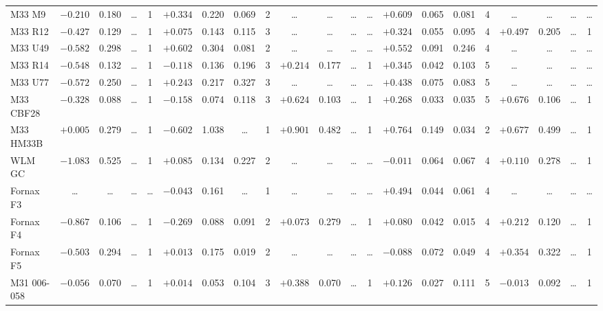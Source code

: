 \documentclass{aa}
\begin{document}
\begin{appendix}
\begin{table*}
\begin{adjustbox}{width=1\textwidth}
{\begin{tabular}{l cccccccccccccccccccc}
M33 M9        & $-0.210$ & 0.180 & \ldots & 1 & $+0.334$ & 0.220 & 0.069 & 2 & \ldots & \ldots & \ldots & \ldots & $+0.609$ & 0.065 & 0.081 & 4 & \ldots & \ldots & \ldots & \ldots \\
M33 R12       & $-0.427$ & 0.129 & \ldots & 1 & $+0.075$ & 0.143 & 0.115 & 3 & \ldots & \ldots & \ldots & \ldots & $+0.324$ & 0.055 & 0.095 & 4 & $+0.497$ & 0.205 & \ldots & 1 \\
M33 U49       & $-0.582$ & 0.298 & \ldots & 1 & $+0.602$ & 0.304 & 0.081 & 2 & \ldots & \ldots & \ldots & \ldots & $+0.552$ & 0.091 & 0.246 & 4 & \ldots & \ldots & \ldots & \ldots \\
M33 R14       & $-0.548$ & 0.132 & \ldots & 1 & $-0.118$ & 0.136 & 0.196 & 3 & $+0.214$ & 0.177 & \ldots & 1 & $+0.345$ & 0.042 & 0.103 & 5 & \ldots & \ldots & \ldots & \ldots \\
M33 U77       & $-0.572$ & 0.250 & \ldots & 1 & $+0.243$ & 0.217 & 0.327 & 3 & \ldots & \ldots & \ldots & \ldots & $+0.438$ & 0.075 & 0.083 & 5 & \ldots & \ldots & \ldots & \ldots \\
M33 CBF28     & $-0.328$ & 0.088 & \ldots & 1 & $-0.158$ & 0.074 & 0.118 & 3 & $+0.624$ & 0.103 & \ldots & 1 & $+0.268$ & 0.033 & 0.035 & 5 & $+0.676$ & 0.106 & \ldots & 1 \\
M33 HM33B     & $+0.005$ & 0.279 & \ldots & 1 & $-0.602$ & 1.038 & \ldots & 1 & $+0.901$ & 0.482 & \ldots & 1 & $+0.764$ & 0.149 & 0.034 & 2 & $+0.677$ & 0.499 & \ldots & 1 \\
WLM GC        & $-1.083$ & 0.525 & \ldots & 1 & $+0.085$ & 0.134 & 0.227 & 2 & \ldots & \ldots & \ldots & \ldots & $-0.011$ & 0.064 & 0.067 & 4 & $+0.110$ & 0.278 & \ldots & 1 \\
Fornax F3     & \ldots & \ldots & \ldots & \ldots & $-0.043$ & 0.161 & \ldots & 1 & \ldots & \ldots & \ldots & \ldots & $+0.494$ & 0.044 & 0.061 & 4 & \ldots & \ldots & \ldots & \ldots \\
Fornax F4     & $-0.867$ & 0.106 & \ldots & 1 & $-0.269$ & 0.088 & 0.091 & 2 & $+0.073$ & 0.279 & \ldots & 1 & $+0.080$ & 0.042 & 0.015 & 4 & $+0.212$ & 0.120 & \ldots & 1 \\
Fornax F5     & $-0.503$ & 0.294 & \ldots & 1 & $+0.013$ & 0.175 & 0.019 & 2 & \ldots & \ldots & \ldots & \ldots & $-0.088$ & 0.072 & 0.049 & 4 & $+0.354$ & 0.322 & \ldots & 1 \\
M31 006-058   & $-0.056$ & 0.070 & \ldots & 1 & $+0.014$ & 0.053 & 0.104 & 3 & $+0.388$ & 0.070 & \ldots & 1 & $+0.126$ & 0.027 & 0.111 & 5 & $-0.013$ & 0.092 & \ldots & 1 \\

\end{tabular}}
\end{adjustbox}
\end{table*}
\end{appendix}
\end{document}
